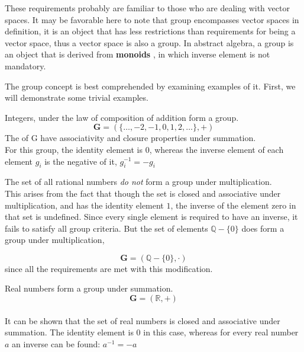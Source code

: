 These requirements probably are familiar to those who are dealing with vector
spaces. It may be favorable here to note that group encompasses vector spaces in definition, it is an object that has less restrictions than requirements for being a vector space, thus a vector
space is also a group. In abstract algebra, a group is an object that is
derived from \textbf{monoids} , in which  inverse element is not mandatory.

The group concept is best comprehended by examining examples of it. First,
we will demonstrate some trivial examples. 

\begin{example}
 Integers, under the law of composition of addition form a group.
\[\mathbf{G} = (\{ \dots,-2,-1,0,1,2,\dots \},+)\]
The  of G have associativity and closure properties under summation.\\ 
For this group, the identity element is $0$, whereas the inverse
element of each element $ g_i $ is the negative of it, $ g_i^{-1} = -g_i $\\
\end{example}


\begin{example}
The set of all rational numbers \emph{do not} form a group under multiplication.\\ This arises
from the fact that though the set is closed and associative under multiplication, and has the identity element $1$, the inverse of the element zero in that set is undefined. Since every single element is required to have an inverse, it fails to satisfy all group criteria. But the set of elements $\mathbb{Q} - \{0\}$ does form a group under multiplication,

\[ \mathbf{G}= (\mathbb{Q} - \{0\},\cdot)\]
since all the requirements are met with this modification. \\
\end{example}

\begin{example}
Real numbers form a group under summation.\\
\[ \mathbf{G} = (\mathbb{R},+)\]\\
It can be shown that the set of real numbers is closed and associative under summation. The identity element is $0$ in this case, whereas for every real number $ a $ an inverse can be found: $ a^{-1}=-a $ 
\end{example}

